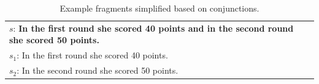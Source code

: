 \documentclass[11pt]{article}
\begin{document}
\begin{table}[h!]
\begin{tabular}{ | m{35em} | }
\hline
\\
\hline
\begin{math}s\end{math}: \textbf{In the first round she scored 40 points and in the second round she scored 50 points.} \\
\hline
\begin{math}s_{1}\end{math}: In the first round she scored 40 points.\\
\hline
\begin{math}s_{2}\end{math}: In the second round she scored 50 points. \\
\hline
\end{tabular}
\caption{Example fragments simplified based on conjunctions.}
\label{figure:appconjunction}
\end{table}
\end{document}
